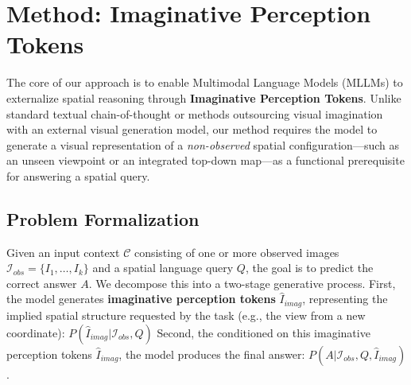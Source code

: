 \documentclass{llmxive}
\begin{document}





\section{Method: Imaginative Perception Tokens}


The core of our approach is to enable Multimodal Language Models (MLLMs) to externalize spatial reasoning through \textbf{Imaginative Perception Tokens}.
Unlike standard textual chain-of-thought
or methods outsourcing visual imagination with an external visual generation model, our method requires the model to generate a visual representation of a \textit{non-observed} spatial configuration---such as an unseen viewpoint or an integrated top-down map---as a functional prerequisite for answering a spatial query.

\subsection{Problem Formalization}
Given an input context $\mathcal{C}$ consisting of one or more observed images $\mathcal{I}_{obs} = \{I_1, \dots, I_k\}$ and a spatial language query $Q$, the goal is to predict the correct answer $A$.
We decompose this into a two-stage generative process.
First, the model generates \textbf{imaginative perception tokens} $\hat{I}_{imag}$, representing the implied spatial structure requested by the task (e.g., the view from a new coordinate): $P(\hat{I}_{imag} | \mathcal{I}_{obs}, Q)$
Second, the conditioned on this imaginative perception tokens $\hat{I}_{imag}$, the model produces the final answer: $P(A | \mathcal{I}_{obs}, Q, \hat{I}_{imag})$.
\end{document}
